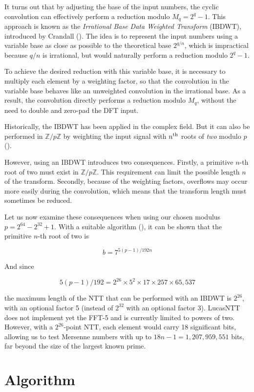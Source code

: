 \documentclass{article}
\begin{document}
It turns out that by adjusting the base of the input numbers, the cyclic convolution can effectively perform a reduction modulo $M_q = 2^q - 1$. This approach is known as the \textit{Irrational Base Data Weighted Transform} (IBDWT), introduced by Crandall (\cite{CF94}). The idea is to represent the input numbers using a variable base as close as possible to the theoretical base $2^{q/n}$, which is impractical because $q/n$ is irrational, but would naturally perform a reduction modulo $2^q - 1$.

To achieve the desired reduction with this variable base, it is necessary to multiply each element by a weighting factor, so that the convolution in the variable base behaves like an unweighted convolution in the irrational base. As a result, the convolution directly performs a reduction modulo $M_q$, without the need to double and zero-pad the DFT input.

Historically, the IBDWT has been applied in the complex field. But it can also be performed in $\mathbb{Z}/p\mathbb{Z}$ by weighting the input signal with $n\textsuperscript{th}$ roots of \emph{two} modulo $p$ (\cite{mon96}).

However, using an IBDWT introduces two consequences. Firstly, a primitive $n$-th root of two must exist in $\mathbb{Z}/p\mathbb{Z}$. This requirement can limit the possible length $n$ of the transform. Secondly, because of the weighting factors, overflows may occur more easily during the convolution, which means that the transform length must sometimes be reduced.

Let us now examine these consequences when using our chosen modulus $p = 2^{64} - 2^{32} + 1$. With a suitable algorithm (\cite{LucasNTT_nttanalysis}), it can be shown that the primitive $n$-th root of two is

$$
b = 7^{5(p-1) / 192n}
$$

\newpage
And since

$$
5(p-1) / 192 = 2^{26} \times 5^2 \times 17 \times 257 \times 65,537
$$

the maximum length of the NTT that can be performed with an IBDWT is $2^{26}$, with an optional factor 5 (instead of $2^{32}$ with an optional factor 3). LucasNTT does not implement yet the FFT-5 and is currently limited to powers of two. However, with a $2^{26}$-point NTT, each element would carry 18 significant bits, allowing us to test Mersenne numbers with up to $18n - 1 = 1,207,959,551$ bits, far beyond the size of the largest known prime.

\section{Algorithm}
\end{document}
